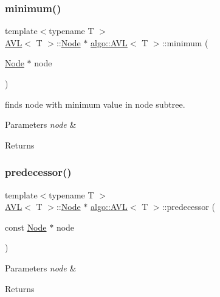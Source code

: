 \subsubsection{\texorpdfstring{minimum()}{minimum()}}
{\footnotesize\ttfamily template$<$typename T $>$ \\
\hyperlink{classalgo_1_1_a_v_l}{A\+VL}$<$ T $>$\+::\hyperlink{structalgo_1_1_a_v_l_1_1_node}{Node} $\ast$ \hyperlink{classalgo_1_1_a_v_l}{algo\+::\+A\+VL}$<$ T $>$\+::minimum (\begin{DoxyParamCaption}\item[{\hyperlink{structalgo_1_1_a_v_l_1_1_node}{Node} $\ast$}]{node }\end{DoxyParamCaption})}

finds node with minimum value in node subtree. 
\begin{DoxyParams}{Parameters}
{\em node} & \\
\hline
\end{DoxyParams}
\begin{DoxyReturn}{Returns}

\end{DoxyReturn}
\mbox{\label{classalgo_1_1_a_v_l_a4a856d5763770a2504b27161467762e6}} 
\subsubsection{\texorpdfstring{predecessor()}{predecessor()}}
{\footnotesize\ttfamily template$<$typename T $>$ \\
\hyperlink{classalgo_1_1_a_v_l}{A\+VL}$<$ T $>$\+::\hyperlink{structalgo_1_1_a_v_l_1_1_node}{Node} $\ast$ \hyperlink{classalgo_1_1_a_v_l}{algo\+::\+A\+VL}$<$ T $>$\+::predecessor (\begin{DoxyParamCaption}\item[{const \hyperlink{structalgo_1_1_a_v_l_1_1_node}{Node} $\ast$}]{node }\end{DoxyParamCaption})}


\begin{DoxyParams}{Parameters}
{\em node} & \\
\hline
\end{DoxyParams}
\begin{DoxyReturn}{Returns}

\end{DoxyReturn}
\mbox{\label{classalgo_1_1_a_v_l_a43ea63a3a8290720c8e73fa73314b5ac}} 
